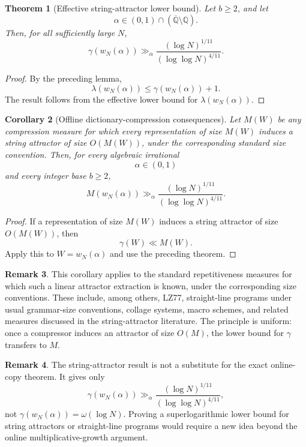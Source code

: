 \documentclass[11pt]{amsart}
\newtheorem{theorem}{Theorem}[section]
\newtheorem{corollary}[theorem]{Corollary}
\theoremstyle{definition}
\newtheorem{remark}[theorem]{Remark}
\begin{document}
\begin{theorem}[Effective string-attractor lower bound]
Let \(b\geq 2\), and let
\[
\alpha\in(0,1)\cap(\overline{\mathbb Q}\setminus\mathbb Q).
\]
Then, for all sufficiently large \(N\),
\[
\gamma(w_N(\alpha))
\gg_{\alpha}
\frac{(\log N)^{1/11}}{(\log\log N)^{4/11}}.
\]
\end{theorem}

\begin{proof}
By the preceding lemma,
\[
\lambda(w_N(\alpha))
\leq
\gamma(w_N(\alpha))+1.
\]
The result follows from the effective lower bound for \(\lambda(w_N(\alpha))\).
\end{proof}

\begin{corollary}[Offline dictionary-compression consequences]
Let \(M(W)\) be any compression measure for which every representation of size \(M(W)\) induces a string attractor of size \(O(M(W))\), under the corresponding standard size convention. Then, for every algebraic irrational
\[
\alpha\in(0,1)
\]
and every integer base \(b\geq 2\),
\[
M(w_N(\alpha))
\gg_{\alpha}
\frac{(\log N)^{1/11}}{(\log\log N)^{4/11}}.
\]
\end{corollary}

\begin{proof}
If a representation of size \(M(W)\) induces a string attractor of size \(O(M(W))\), then
\[
\gamma(W)\ll M(W).
\]
Apply this to \(W=w_N(\alpha)\) and use the preceding theorem.
\end{proof}

\begin{remark}
This corollary applies to the standard repetitiveness measures for which such a linear attractor extraction is known, under the corresponding size conventions. These include, among others, LZ77, straight-line programs under usual grammar-size conventions, collage systems, macro schemes, and related measures discussed in the string-attractor literature. The principle is uniform: once a compressor induces an attractor of size \(O(M)\), the lower bound for \(\gamma\) transfers to \(M\).
\end{remark}

\begin{remark}
The string-attractor result is not a substitute for the exact online-copy theorem. It gives only
\[
\gamma(w_N(\alpha))
\gg_{\alpha}
\frac{(\log N)^{1/11}}{(\log\log N)^{4/11}},
\]
not \(\gamma(w_N(\alpha))=\omega(\log N)\). Proving a superlogarithmic lower bound for string attractors or straight-line programs would require a new idea beyond the online multiplicative-growth argument.
\end{remark}
\end{document}
